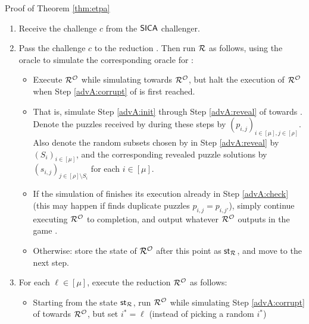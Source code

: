 \begin{namedproof}{Proof of Theorem \ref{thm:etpa}}
  \begin{enumerate}[itemsep=0.1cm]
    \item Receive the challenge \(c\) from the \(\mathsf{SICA}\) challenger.
    \item\label{advM:second} Pass the challenge \(c\) to the reduction \redR. Then run \(\redR\) as follows,
          using the oracle \oracle to simulate the corresponding oracle for \redR:
          \begin{itemize}[label={\textbullet},itemsep=0.1cm]
            \item Execute \(\redR^{\oracle}\) while simulating \advA towards \(\redR^{\oracle}\),
                  but halt the execution of \(\redR^{\oracle}\)
                  when Step \ref{advA:corrupt} of \advA is first reached.
            \item That is, simulate Step \ref{advA:init} through Step \ref{advA:reveal} of \advA towards \redR.
                  Denote the puzzles received by \advA during these steps by
                  \((p_{i,j})_{i \in [\mu], j \in [\rho]}\).
                  Also denote the random subsets chosen by \advA in Step \ref{advA:reveal}
                  by \((S_{i})_{i \in [\mu]}\),
                  and the corresponding revealed puzzle solutions by \((s_{i,j})_{j \in [\rho] \setminus S_{i}}\)
                  for each \(i \in [\mu]\).
            \item If the simulation of \advA finishes its execution already in Step \ref{advA:check}
                  (this may happen if \advA finds duplicate puzzles \(p_{i,j} = p_{i,j'}\)),
                  simply continue executing \(\redR^{\oracle}\) to completion,
                  and output whatever \(\redR^{\oracle}\) outputs in the game \SICA.
            \item Otherwise: store the state of \(\redR^{\oracle}\) after this point as \(\state_{\redR}\),
                  and move to the next step.
          \end{itemize}
    \item\label{advM:rewind}
          For each \(\ell \in [\mu]\), execute the reduction \(\redR^{\oracle}\) as follows:
          \begin{itemize}[label={\textbullet},itemsep=0.1cm]
            \item Starting from the state \(\state_{\redR}\),
                  run \(\redR^{\oracle}\) while simulating Step
                  \ref{advA:corrupt} of \advA towards \(\redR^{\oracle}\),
                  but set \(i^{*} = \ell\) (instead of picking a random \(i^{*}\))

\end{itemize}
\end{enumerate}
\end{namedproof}
